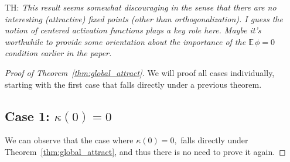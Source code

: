 \documentclass[twoside]{article}
\newcommand{\E}{\mathbb{E}\,}
\theoremstyle{definition}
\newcommand{\thomas}[1]{{\color{blue}TH:  \textit{#1}}}
\begin{document}
\thomas{This result seems somewhat discouraging in the sense that there are no interesting (attractive) fixed points (other than orthogonalization). I guess the notion of centered activation functions plays a key role here. Maybe it's worthwhile to provide some orientation about the importance of the $\E\phi=0$ condition earlier in the paper.}


\begin{proof}[Proof of Theorem~\ref{thm:global_attract}]
We will proof all cases individually, starting with the first case that falls directly under a previous theorem. 

\subsection*{Case 1: $\kappa(0)=0$}
We can observe that the case where $\kappa(0)=0,$ falls directly under Theorem~\ref{thm:global_attract}, and thus there is no need to prove it again.


\end{proof}
\end{document}
